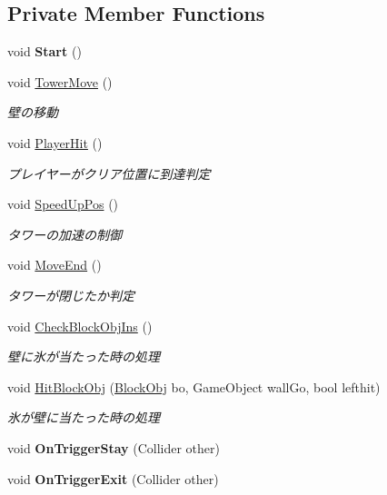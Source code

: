 \subsection*{Private Member Functions}
\begin{DoxyCompactItemize}
\item 
\mbox{\label{class_tower_a27481580a6c5d53115224704ee816cfd}} 
void {\bfseries Start} ()
\item 
void \hyperlink{class_tower_a5e3288c47bd324050fc3bf3a944b6182}{Tower\+Move} ()
\begin{DoxyCompactList}\small\item\em 壁の移動 \end{DoxyCompactList}\item 
void \hyperlink{class_tower_a876271f182e443afbf24c59a5bee3fd9}{Player\+Hit} ()
\begin{DoxyCompactList}\small\item\em プレイヤーがクリア位置に到達判定 \end{DoxyCompactList}\item 
void \hyperlink{class_tower_ae677bb0263feb2c923801a2c3699796e}{Speed\+Up\+Pos} ()
\begin{DoxyCompactList}\small\item\em タワーの加速の制御 \end{DoxyCompactList}\item 
void \hyperlink{class_tower_a0d51b488f4a8bb8596222b342f48799e}{Move\+End} ()
\begin{DoxyCompactList}\small\item\em タワーが閉じたか判定 \end{DoxyCompactList}\item 
void \hyperlink{class_tower_a28221b36c86603e04ea08244fb630b8c}{Check\+Block\+Obj\+Ins} ()
\begin{DoxyCompactList}\small\item\em 壁に氷が当たった時の処理 \end{DoxyCompactList}\item 
void \hyperlink{class_tower_aa742c79c293976905d8948f338e163d5}{Hit\+Block\+Obj} (\hyperlink{class_block_obj}{Block\+Obj} bo, Game\+Object wall\+Go, bool lefthit)
\begin{DoxyCompactList}\small\item\em 氷が壁に当たった時の処理 \end{DoxyCompactList}\item 
\mbox{\label{class_tower_a822223b4500ce04e03c8d1402b68323d}} 
void {\bfseries On\+Trigger\+Stay} (Collider other)
\item 
\mbox{\label{class_tower_a32bc35850a4c1c6b25b47cae42d6e2cd}} 
void {\bfseries On\+Trigger\+Exit} (Collider other)
\end{DoxyCompactItemize}

